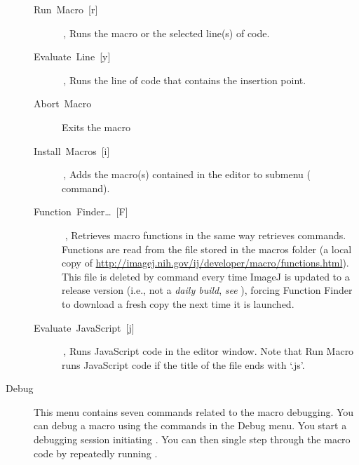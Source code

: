 \begin{description}
\begin{description}
\item [{\textsf{Run\ Macro\ {[}r{]}}}] \,,
Runs the macro or the selected line(s) of code.
\item [{\textsf{Evaluate\ Line\ {[}y{]}}}] \,,
Runs the line of code that contains the insertion point.
\item [{\textsf{Abort\ Macro}}] Exits the macro
\item [{\textsf{Install\ Macros\ {[}i{]}}}] \,,
Adds the macro(s) contained in the editor to \textsf{}
submenu (\textsf{}
command).
\item [{\textsf{\label{FunctionFinder[F]}Function\ Finder\ldots{}\ {[}F{]}}}] \,\,,
\cite{C-FxFinder} Retrieves macro functions
in the same way  retrieves commands.
Functions are read from the  file stored
in the macros folder (a local copy of \url{http://imagej.nih.gov/ij/developer/macro/functions.html}).
This file is deleted by \textsf{}
command every time ImageJ is updated to a release version (i.e., not
a \emph{daily build}, \emph{see} ),
forcing Function Finder to download a fresh copy the next time it
is launched.
\item [{\textsf{\label{misc:EvaluateJavaScript}Evaluate\ JavaScript\ {[}j{]}}}] \,,
Runs JavaScript code in the editor window. Note that \textsf{Run Macro
}runs JavaScript code if the title of the file ends with `.js'.
\end{description}
\item [{\textsf{Debug}\emph{\lyxarrow{}}}] This menu contains seven commands
related to the macro debugging. You can debug a macro
using the commands in the \textsf{Debug} menu. You start a debugging
session initiating \textsf{}. You can
then single step through the macro code by repeatedly running \textsf{}. 


\end{description}

